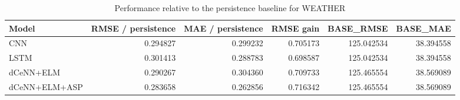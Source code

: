 \begin{table}
\caption{Performance relative to the persistence baseline for WEATHER}
\begin{tabular}{lrrrrr}
\toprule
Model & RMSE / persistence & MAE / persistence & RMSE gain & BASE\_RMSE & BASE\_MAE \\
\midrule
CNN & 0.294827 & 0.299232 & 0.705173 & 125.042534 & 38.394558 \\
LSTM & 0.301413 & 0.288783 & 0.698587 & 125.042534 & 38.394558 \\
dCeNN+ELM & 0.290267 & 0.304360 & 0.709733 & 125.465554 & 38.569089 \\
dCeNN+ELM+ASP & 0.283658 & 0.262856 & 0.716342 & 125.465554 & 38.569089 \\
\bottomrule
\end{tabular}
\end{table}
